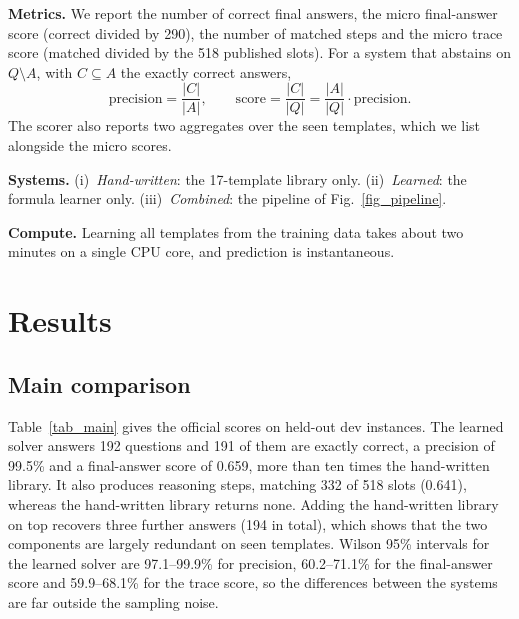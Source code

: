\documentclass[conference]{IEEEtran}
\begin{document}
\textbf{Metrics.} We report the number of correct final answers, the micro
final-answer score (correct divided by 290), the number of matched steps and the
micro trace score (matched divided by the 518 published slots). For a system that
abstains on $Q\setminus A$, with $C\subseteq A$ the exactly correct answers,
\begin{equation}
\text{precision}=\frac{|C|}{|A|},\qquad
\text{score}=\frac{|C|}{|Q|}=\frac{|A|}{|Q|}\cdot\text{precision}.
\label{eq_score}
\end{equation}
The scorer also reports two aggregates over the seen templates, which we list
alongside the micro scores.

\textbf{Systems.} (i)~\emph{Hand-written}: the 17-template library only.
(ii)~\emph{Learned}: the formula learner only. (iii)~\emph{Combined}: the
pipeline of Fig.~\ref{fig_pipeline}.

\textbf{Compute.} Learning all templates from the training data takes about two
minutes on a single CPU core, and prediction is instantaneous.

\section{Results}
\label{sec_results}
\subsection{Main comparison}
Table~\ref{tab_main} gives the official scores on held-out dev instances. The
learned solver answers 192 questions and 191 of them are exactly correct, a
precision of 99.5\% and a final-answer score of 0.659, more than ten times the
hand-written library. It also produces reasoning steps, matching 332 of 518
slots (0.641), whereas the hand-written library returns none. Adding the
hand-written library on top recovers three further answers (194 in total),
which shows that the two components are largely redundant on seen templates.
Wilson 95\% intervals for the learned solver are 97.1--99.9\% for precision,
60.2--71.1\% for the final-answer score and 59.9--68.1\% for the trace score, so
the differences between the systems are far outside the sampling noise.
\end{document}
